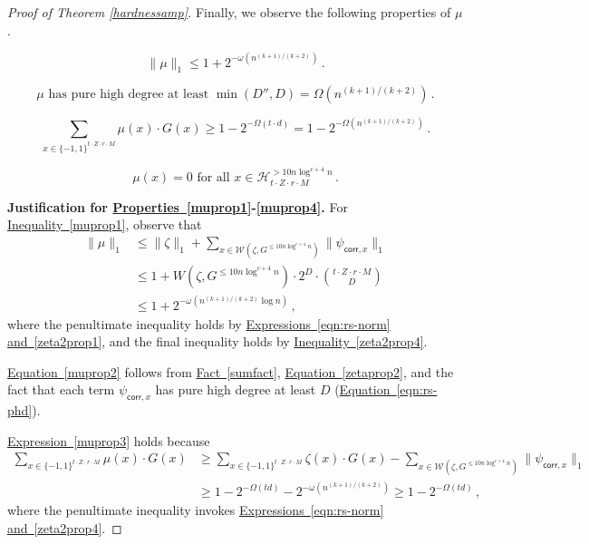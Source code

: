 \documentclass[11pt]{article}
\numberwithin{equation}{section}
\theoremstyle{definition}
\theoremstyle{plain}
\newcommand{\expref}[2]{\hyperref[#2]{#1~\ref{#2}}}
\newcommand{\expeqref}[2]{\hyperref[#2]{#1~\eqref{#2}}}
\newcommand{\bits}{\{-1,1\}}
\begin{document}
\begin{proof}[Proof of Theorem \ref{hardnessamp}]
%
%
%
%
Finally, we observe the following properties of $\mu$. %
	
	\begin{equation}\label{muprop1}
	\|\mu\|_1\leq 1 + 2^{-\omega(n^{(k+1)/(k+2)})}\,.
	\end{equation}
	
	\begin{equation}\label{muprop2}
	\mu \text{ has pure high degree at least }  \min(D'', D) = \Omega\left(n^{(k+1)/(k+2)}\right)\,.
	\end{equation}
	
	\begin{equation}\label{muprop3}
	\sum_{x\in\bits^{t \cdot Z \cdot r \cdot M}} \mu(x) \cdot G(x)  \geq 1-2^{-\Omega(t \cdot d)} = 1-2^{-\Omega\left(n^{(k+1)/(k+2)}\right)}\,.
	\end{equation}
	
	\begin{equation}\label{muprop4}
	\mu(x)=0 \text{ for all } x \in \mathcal{H}_{t \cdot Z \cdot r \cdot M}^{> 10 n \log^{c+4} n}\,.
	\end{equation}
	
	\medskip \noindent \textbf{Justification for \expeqref{Properties}{muprop1}-\eqref{muprop4}.}
	For \expeqref{Inequality}{muprop1}, observe that 
	\begin{align*}\|\mu\|_1 &\leq \|\zeta\|_1 + \sum_{x \in \mathcal{W}(\zeta, G^{\leq 10 n \log^{c+4} n})} \|\psi_{\mathsf{corr}, x}\|_1\\
	&\leq 1 + W(\zeta, G^{\leq 10 n \log^{c+4} n}) \cdot 2^D \cdot {t \cdot Z \cdot r \cdot M \choose D}  \\&\leq
	1 + 2^{-\omega\left(n^{(k+1)/(k+2)} \log n\right)}\,,
	\end{align*}
	where the penultimate inequality holds by \expeqref{Expressions}{eqn:rs-norm} \expeqref{and}{zeta2prop1}, and the final inequality holds by \expeqref{Inequality}{zeta2prop4}.
	
\expeqref{Equation}{muprop2} follows from \expref{Fact}{sumfact}, \expeqref{Equation}{zetaprop2}, and the fact that each term $\psi_{\mathsf{corr}, x}$ has pure high degree at least $D$ (\expeqref{Equation}{eqn:rs-phd}).
	
	\expeqref{Expression}{muprop3} holds because \begin{align*} \sum_{x\in\bits^{t \cdot Z \cdot r \cdot M}} \mu(x) \cdot G(x)
	&\geq \sum_{x\in\bits^{t \cdot Z \cdot r \cdot M}} \zeta(x) \cdot G(x) - \sum_{x \in \mathcal{W}\left(\zeta, G^{\leq 10 n \log^{c+4} n}\right)} \|\psi_{\mathsf{corr},x}\|_1\\
	&\geq 1 - 2^{-\Omega(td)} -  2^{-\omega(n^{(k+1)/(k+2)})} \geq 1 - 2^{-\Omega(td)}\,,\end{align*}
	where the penultimate inequality invokes \expeqref{Expressions}{eqn:rs-norm} \expeqref{and}{zeta2prop4}.
	

\end{proof}
\end{document}
